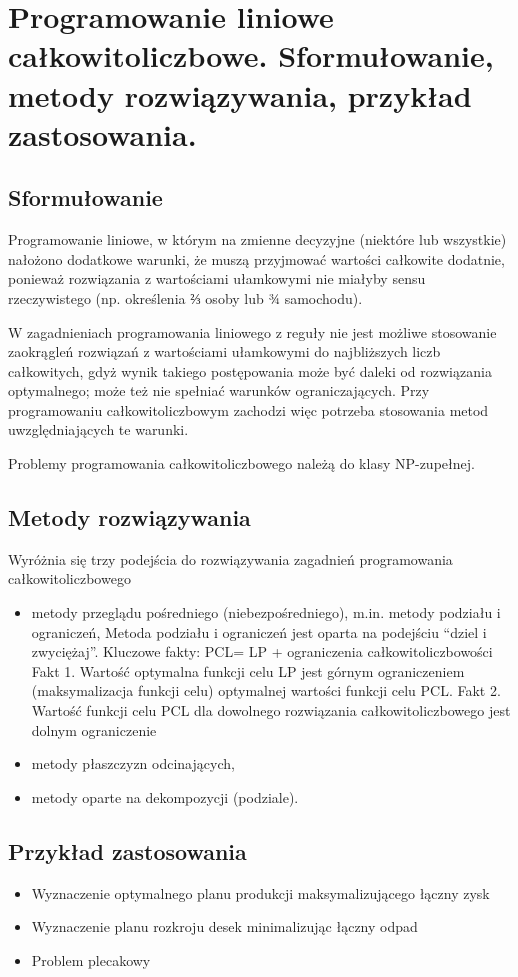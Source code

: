 \section{Programowanie liniowe całkowitoliczbowe. Sformułowanie, metody
rozwiązywania, przykład zastosowania.}
\subsection{Sformułowanie}
Programowanie liniowe, w którym na zmienne decyzyjne (niektóre lub wszystkie) nałożono dodatkowe warunki, że muszą przyjmować wartości całkowite dodatnie, ponieważ rozwiązania z wartościami ułamkowymi nie miałyby sensu rzeczywistego (np. określenia ⅔ osoby lub ¾ samochodu).

W zagadnieniach programowania liniowego z reguły nie jest możliwe stosowanie zaokrągleń rozwiązań z wartościami ułamkowymi do najbliższych liczb całkowitych, gdyż wynik takiego postępowania może być daleki od rozwiązania optymalnego; może też nie spełniać warunków ograniczających. Przy programowaniu całkowitoliczbowym zachodzi więc potrzeba stosowania metod uwzględniających te warunki.

Problemy programowania całkowitoliczbowego należą do klasy NP-zupełnej.


\subsection{Metody rozwiązywania}
Wyróżnia się trzy podejścia do rozwiązywania zagadnień programowania całkowitoliczbowego
\begin{itemize}
\item metody przeglądu pośredniego (niebezpośredniego), m.in. metody podziału i ograniczeń,
Metoda podziału i ograniczeń jest oparta na podejściu “dziel i zwyciężaj”.
Kluczowe fakty:\newline
PCL= LP + ograniczenia całkowitoliczbowości\newline
Fakt 1. Wartość optymalna funkcji celu LP jest górnym ograniczeniem (maksymalizacja
funkcji celu) optymalnej wartości funkcji celu PCL.\newline
Fakt 2. Wartość funkcji celu PCL dla dowolnego rozwiązania całkowitoliczbowego
jest dolnym ograniczenie\newline
\item metody płaszczyzn odcinających,
\item metody oparte na dekompozycji (podziale).
\end{itemize}


\subsection{Przykład zastosowania}
\begin{itemize}
\item Wyznaczenie optymalnego planu produkcji maksymalizującego łączny zysk
\item Wyznaczenie planu rozkroju desek minimalizując łączny odpad
\item Problem plecakowy
\end{itemize}
